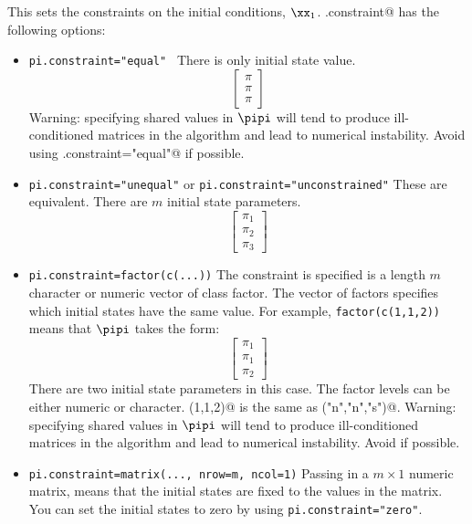 This sets the constraints on the initial conditions, $\xx_1$.  \verb@pi.constraint@ has the following options:
\begin{itemize}\itemsep5pt
\item[] \texttt{pi.constraint="equal" } There is only initial state value.
\begin{equation*}
 \left[ \begin{array}{c}
    \pi \\
    \pi \\
    \pi \end{array} \right]
\end{equation*}
Warning: specifying shared values in $\pipi$ will tend to produce ill-conditioned matrices in the algorithm and lead to numerical instability.  Avoid using \verb@pi.constraint="equal"@ if possible.

\item[] \texttt{pi.constraint="unequal"} or \texttt{pi.constraint="unconstrained"} These are equivalent.  There are $m$ initial state parameters.  
\begin{equation*}
 \left[ \begin{array}{c}
    \pi_1\\
    \pi_2\\
    \pi_3 \end{array} \right]
\end{equation*}

\item[] \texttt{pi.constraint=factor(c(...))} The constraint is specified is a length $m$ character or numeric vector of class factor.  The vector of factors specifies which initial states have the same value.  For example, \texttt{factor(c(1,1,2))} means that $\pipi$ takes the form:
\begin{equation*}
 \left[ \begin{array}{c}
    \pi_1 \\
    \pi_1 \\
    \pi_2 \end{array} \right]
\end{equation*}
There are two initial state parameters in this case.  The factor levels can be either numeric or character.  \verb@c(1,1,2)@ is the same as \verb@c("n","n","s")@.
Warning: specifying shared values in $\pipi$ will tend to produce ill-conditioned matrices in the algorithm and lead to numerical instability.  Avoid if possible.

\item[] \texttt{pi.constraint=matrix(..., nrow=m, ncol=1)}  Passing in a $m \times 1$ numeric matrix, means that the initial states are fixed to the values in the matrix. You can set the initial states to zero by using \texttt{pi.constraint="zero"}. 


\end{itemize}
